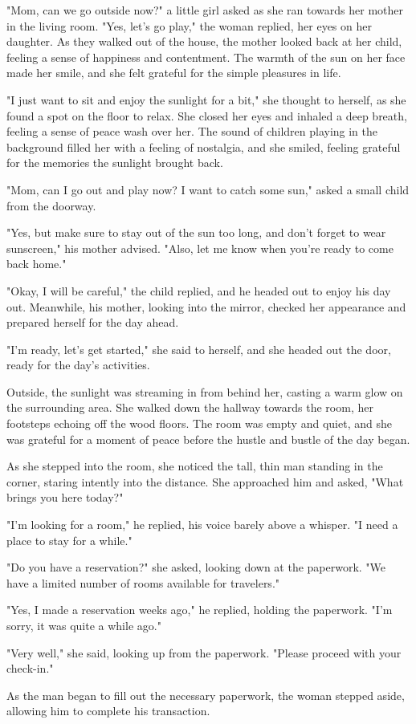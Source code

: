 \documentclass[smalldemyvopaper,11pt,twoside,onecolumn,openright,extrafontsizes]{memoir}
\begin{document}
"Mom, can we go outside now?" a little girl asked as she ran towards her mother in the living room. "Yes, let's go play," the woman replied, her eyes on her daughter. As they walked out of the house, the mother looked back at her child, feeling a sense of happiness and contentment. The warmth of the sun on her face made her smile, and she felt grateful for the simple pleasures in life.\par
"I just want to sit and enjoy the sunlight for a bit," she thought to herself, as she found a spot on the floor to relax. She closed her eyes and inhaled a deep breath, feeling a sense of peace wash over her. The sound of children playing in the background filled her with a feeling of nostalgia, and she smiled, feeling grateful for the memories the sunlight brought back.\par
"Mom, can I go out and play now? I want to catch some sun," asked a small child from the doorway.\par
"Yes, but make sure to stay out of the sun too long, and don't forget to wear sunscreen," his mother advised. "Also, let me know when you're ready to come back home."\par
"Okay, I will be careful," the child replied, and he headed out to enjoy his day out. Meanwhile, his mother, looking into the mirror, checked her appearance and prepared herself for the day ahead.\par
"I'm ready, let's get started," she said to herself, and she headed out the door, ready for the day's activities.\par
Outside, the sunlight was streaming in from behind her, casting a warm glow on the surrounding area. She walked down the hallway towards the room, her footsteps echoing off the wood floors. The room was empty and quiet, and she was grateful for a moment of peace before the hustle and bustle of the day began.\par
As she stepped into the room, she noticed the tall, thin man standing in the corner, staring intently into the distance. She approached him and asked, "What brings you here today?"\par
"I'm looking for a room," he replied, his voice barely above a whisper. "I need a place to stay for a while."\par
"Do you have a reservation?" she asked, looking down at the paperwork. "We have a limited number of rooms available for travelers."\par
"Yes, I made a reservation weeks ago," he replied, holding the paperwork. "I'm sorry, it was quite a while ago."\par
"Very well," she said, looking up from the paperwork. "Please proceed with your check-in."\par
As the man began to fill out the necessary paperwork, the woman stepped aside, allowing him to complete his transaction.\par
\end{document}
